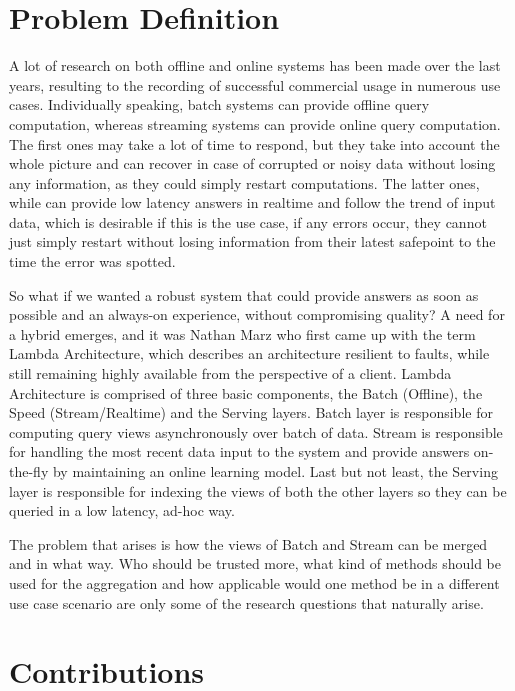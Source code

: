\documentclass{lmproj}
\begin{document}
\section{Problem Definition}
\label{intro}

A lot of research on both offline and online systems has been made over the last years, resulting to the recording of successful commercial usage in numerous use cases. Individually speaking, batch systems can provide offline query computation, whereas streaming systems can provide online query computation. The first ones may take a lot of time to respond, but they take into account the whole picture and can recover in case of corrupted or noisy data without losing any information, as they could simply restart computations. The latter ones, while can provide low latency answers in realtime and follow the trend of input data, which is desirable if this is the use case, if any errors occur, they cannot just simply restart without losing information from their latest safepoint to the time the error was spotted.

So what if we wanted a robust system that could provide answers as soon as possible and an always-on experience, without compromising quality? A need for a hybrid emerges, and it was Nathan Marz who first came up with the term Lambda Architecture, which describes an architecture resilient to faults, while still remaining highly available from the perspective of a client. Lambda Architecture is comprised of three basic components, the Batch (Offline), the Speed (Stream/Realtime) and the Serving layers. Batch layer is responsible for computing query views asynchronously over batch of data. Stream is responsible for handling the most recent data input to the system and provide answers on-the-fly by maintaining an online learning model. Last but not least, the Serving layer is responsible for indexing the views of both the other layers so they can be queried in a low latency, ad-hoc way.

The problem that arises is how the views of Batch and Stream can be merged and in what way. Who should be trusted more, what kind of methods should be used for the aggregation and how applicable would one method be in a different use case scenario are only some of the research questions that naturally arise. 

\section{Contributions}
\label{intro}
\end{document}
